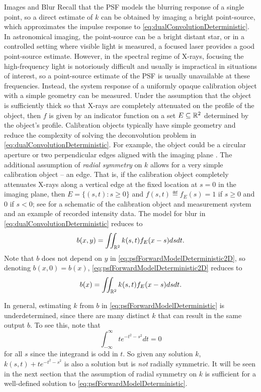 \begin{chapter}{Images and Blur}
  Recall that the PSF models the blurring response of a single point, so a direct estimate of $k$ can be obtained by imaging a bright point-source, which approximates the impulse response to \eqref{eq:dualConvolutionDeterministic}.
  In astronomical imaging, the point-source can be a bright distant star, or in a controlled setting where visible light is measured, a focused laser provides a good point-source estimate.
  However, in the spectral regime of X-rays, focusing the high-frequency light is notoriously difficult and usually is impractical in situations of interest, so a point-source estimate of the PSF is usually unavailable at these frequencies.
  Instead, the system response of a uniformly opaque calibration object with a simple geometry can be measured.
  Under the assumption that the object is sufficiently thick so that X-rays are completely attenuated on the profile of the object, then $f$ is given by an indicator function on a set $E \subseteq \mathbb R^2$ determined by the object's profile.
  Calibration objects typically have simple geometry and reduce the complexity of solving the deconvolution problem in \eqref{eq:dualConvolutionDeterministic}.  
  For example, the object could be a circular aperture or two perpendicular edges aligned with the imaging plane \citep{doering1992,watson1993}.
  The additional assumption of \emph{radial symmetry} on $k$ allows for a very simple calibration object -- an edge. 
  That is, if the calibration object completely attenuates X-rays along a vertical edge at the fixed location at $s=0$ in the imaging plane, then $E=\{(s,t):s\ge0\}$ and $f(s,t) \eqdef f_E(s) = 1$ if $s\ge0$ and $0$ if $s <0$; see  for a schematic of the calibration object and measurement system and an example of recorded intensity data.
  The model for blur in \eqref{eq:dualConvolutionDeterministic} reduces to
\begin{equation}\label{eq:psfForwardModelDeterministic2D}
  b(x,y) = \iint_{\mathbb R^2} k(s,t) f_E(x-s)dsdt. 
\end{equation}
  Note that $b$ does not depend on $y$ in \eqref{eq:psfForwardModelDeterministic2D}, so denoting $b(x,0) = b(x)$, \eqref{eq:psfForwardModelDeterministic2D} reduces to
\begin{equation}\label{eq:psfForwardModelDeterministic}
  b(x) = \iint_{\mathbb R^2} k(s,t) f_E(x-s)dsdt. 
\end{equation} 
  
  In general, estimating $k$ from $b$ in \eqref{eq:psfForwardModelDeterministic} is underdetermined, since there are many distinct $k$ that can result in the same output $b$.
  To see this, note that 
  \begin{equation}
    \int_{-\infty}^{\infty} te^{-t^2 - s^2}dt = 0
  \end{equation}
  for all $s$ since the integrand is odd in $t$.
  So given any solution $k$, $k(s,t)+te^{-t^2 - s^2}$ is also a solution but is \emph{not} radially symmetric.
  It will be seen in the next section that the assumption of radial symmetry on $k$ is sufficient for a well-defined solution to \eqref{eq:psfForwardModelDeterministic}.


\end{chapter}
